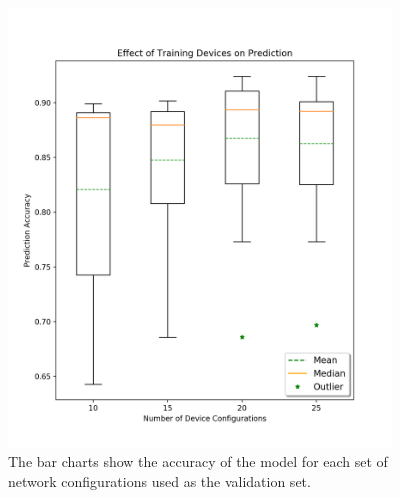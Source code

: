 \begin{figure}[H]
	\centering
	\includegraphics[width=4in]{umn_analysis.png}
	\caption{The bar charts show the accuracy of the model for each set of network configurations used as the validation set.}
\end{figure}
